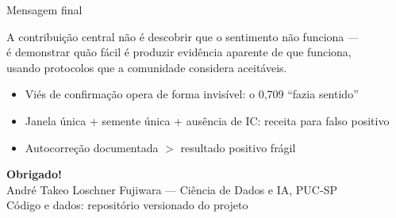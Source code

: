 \documentclass[10pt,aspectratio=169]{beamer}
\begin{document}
\begin{frame}{Mensagem final}
  \begin{block}{}
    \centering\large
    A contribuição central não é descobrir que o sentimento não funciona ---\\
    é demonstrar \alert{quão fácil é produzir evidência aparente de que funciona},\\
    usando protocolos que a comunidade considera aceitáveis.
  \end{block}
  \vspace{2ex}
  \begin{itemize}
    \item Viés de confirmação opera de forma invisível: o 0{,}709 ``fazia sentido''
    \item Janela única + semente única + ausência de IC: receita para falso positivo
    \item Autocorreção documentada $>$ resultado positivo frágil
  \end{itemize}
  \vspace{2ex}
  \centering
  \textbf{Obrigado!}\\[1ex]
  \footnotesize André Takeo Loschner Fujiwara --- Ciência de Dados e IA, PUC-SP\\
  Código e dados: repositório versionado do projeto
\end{frame}
\end{document}
